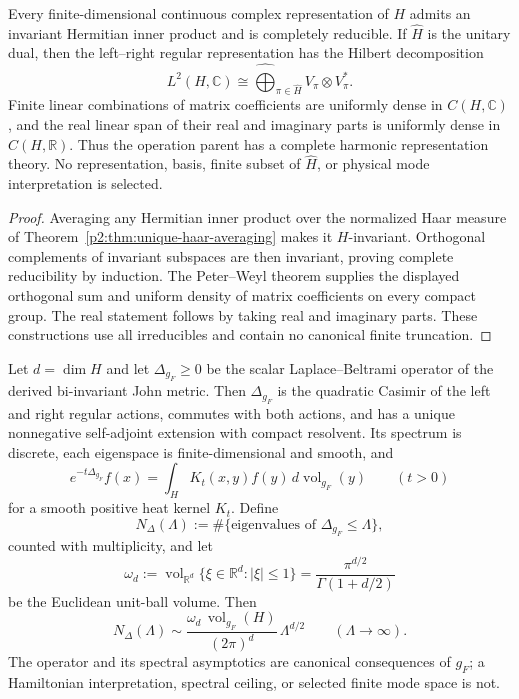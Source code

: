 \documentclass[11pt,a4paper]{article}
\begin{document}
\begin{theorem}
\label{p2:thm:peter-weyl-complete-reducibility}
Every finite-dimensional continuous complex representation of \(H\) admits an
invariant Hermitian inner product and is completely reducible.  If
\(\widehat H\) is the unitary dual, then the left--right regular
representation has the Hilbert decomposition
\[
 L^2(H,\mathbb C)
 \cong
 \widehat{\bigoplus}_{\pi\in\widehat H}
 V_\pi\otimes V_\pi^*.
\]
Finite linear combinations of matrix coefficients are uniformly dense in
\(C(H,\mathbb C)\), and the real linear span of their real and imaginary
parts is uniformly dense in \(C(H,\mathbb R)\).  Thus the operation parent has a complete
harmonic representation theory.  No representation, basis, finite subset of
\(\widehat H\), or physical mode interpretation is selected.
\end{theorem}

\begin{proof}
Averaging any Hermitian inner product over the normalized Haar measure of
Theorem~\ref{p2:thm:unique-haar-averaging} makes it \(H\)-invariant.
Orthogonal complements of invariant subspaces are then invariant, proving
complete reducibility by induction.  The Peter--Weyl theorem supplies the
displayed orthogonal sum and uniform density of matrix coefficients on every
compact group.  The real statement follows by taking real and imaginary
parts.  These constructions use all irreducibles and contain no canonical
finite truncation.
\end{proof}

\begin{theorem}
\label{p2:thm:laplace-casimir-heat-closure}
Let \(d=\dim H\) and let \(\Delta_{g_F}\ge0\) be the scalar
Laplace--Beltrami operator of the derived bi-invariant John metric.  Then
\(\Delta_{g_F}\) is the quadratic Casimir of the left and right regular
actions, commutes with both actions, and has a unique nonnegative
self-adjoint extension with compact resolvent.  Its spectrum is discrete,
each eigenspace is finite-dimensional and smooth, and
\[
 e^{-t\Delta_{g_F}}f(x)
 =\int_H K_t(x,y)f(y)\,d\operatorname{vol}_{g_F}(y)
 \qquad(t>0)
\]
for a smooth positive heat kernel \(K_t\).  Define
\[
 N_\Delta(\Lambda)
 :=\#\{\text{eigenvalues of }\Delta_{g_F}\leq\Lambda\},
\]
counted with multiplicity, and let
\[
 \omega_d
 :=
 \operatorname{vol}_{\mathbb R^d}
 \{\xi\in\mathbb R^d:\lvert\xi\rvert\leq1\}
 =
 \frac{\pi^{d/2}}{\Gamma(1+d/2)}
\]
be the Euclidean unit-ball volume.  Then
\[
 N_\Delta(\Lambda)
 \sim
 \frac{\omega_d\,\operatorname{vol}_{g_F}(H)}
 {(2\pi)^d}\,\Lambda^{d/2}
 \qquad(\Lambda\to\infty).
\]
The operator and its spectral asymptotics are canonical consequences of
\(g_F\); a Hamiltonian interpretation, spectral ceiling, or selected finite
mode space is not.
\end{theorem}
\end{document}
